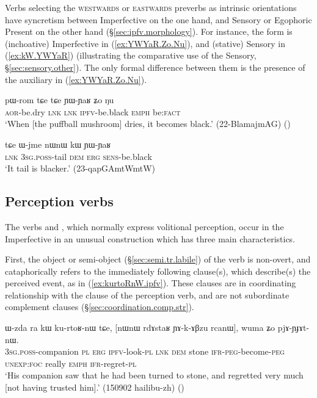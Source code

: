 Verbs selecting the \textsc{westwards} or \textsc{eastwards} preverbs as intrinsic orientations have syncretism between Imperfective on the one hand, and Sensory or Egophoric Present on the other hand (§\ref{sec:ipfv.morphology}). For instance, the form  is (inchoative) Imperfective in (\ref{ex:YWYaR.Zo.Nu}), and (stative) Sensory in (\ref{ex:kW.YWYaR}) (illustrating the comparative use of the Sensory, §\ref{sec:sensory.other}). The only formal difference between them is the presence of the auxiliary  in (\ref{ex:YWYaR.Zo.Nu}).

\begin{exe}
\ex \label{ex:YWYaR.Zo.Nu}
\gll  pɯ-rom tɕe tɕe ɲɯ-ɲaʁ ʑo ŋu \\
\textsc{aor}-be.dry \textsc{lnk} \textsc{lnk} \textsc{ipfv}-be.black \textsc{emph} be:\textsc{fact} \\
\glt `When [the puffball mushroom] dries, it becomes black.' (22-BlamajmAG)
()
\end{exe}

\begin{exe}
\ex \label{ex:kW.YWYaR}
\gll  tɕe ɯ-jme nɯnɯ kɯ ɲɯ-ɲaʁ \\
\textsc{lnk} \textsc{3sg}.\textsc{poss}-tail \textsc{dem} \textsc{erg} \textsc{sens}-be.black \\
\glt `It tail is blacker.' (23-qapGAmtWmtW)
\end{exe}


\subsection{Perception verbs} \label{sec:ipfv.perception}
The verbs  and , which normally express volitional perception, occur in the Imperfective in an unusual construction which has three main characteristics. 

First, the object or semi-object (§\ref{sec:semi.tr.labile}) of the verb is non-overt, and cataphorically refers to the immediately following clause(s), which describe(s) the perceived event, as in (\ref{ex:kurtoRnW.ipfv}). These clauses are in coordinating relationship with the clause of the perception verb, and are not subordinate complement clauses (§\ref{sec:coordination.comp.str}).

\begin{exe}
\ex \label{ex:kurtoRnW.ipfv}
\gll ɯ-zda ra kɯ ku-rtoʁ-nɯ tɕe, [nɯnɯ rdɤstaʁ ɲɤ-k-ɤβzu rcanɯ], wuma ʑo pjɤ-ɲɟɤt-nɯ. \\
\textsc{3sg}.\textsc{poss}-companion \textsc{pl} \textsc{erg} \textsc{ipfv}-look-\textsc{pl} \textsc{lnk} \textsc{dem} stone \textsc{ifr}-\textsc{peg}-become-\textsc{peg} \textsc{unexp}:\textsc{foc} really \textsc{emph} \textsc{ifr}-regret-\textsc{pl} \\
\glt `His companion saw that he had been turned to stone, and regretted very much [not having trusted him].' (150902 hailibu-zh)
()
\end{exe}

